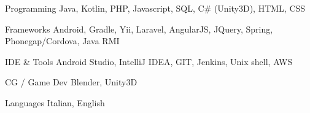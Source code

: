 


\begin{cvskills}


\cvskill
{Programming} %
{Java, Kotlin, PHP, Javascript, SQL, C\# (Unity3D), HTML, CSS} %


\cvskill
{Frameworks} %
{Android, Gradle, Yii, Laravel, AngularJS, JQuery, Spring, Phonegap/Cordova, Java RMI} %


\cvskill
{IDE \& Tools} %
{Android Studio, IntelliJ IDEA, GIT, Jenkins, Unix shell, AWS} %


\cvskill
{CG / Game Dev} %
{Blender, Unity3D} %


\cvskill
{Languages} %
{Italian, English} %


\end{cvskills}